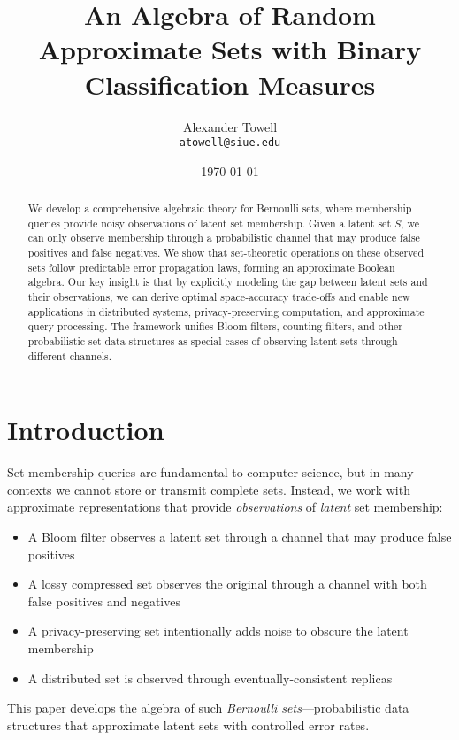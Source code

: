 \documentclass[11pt,final,hidelinks]{article}
\title{An Algebra of Random Approximate Sets with Binary Classification Measures}
\author{
    Alexander Towell\\
    \texttt{atowell@siue.edu}
}
\date{\today}
\begin{document}
\maketitle
\NotationSection

\begin{abstract}
We develop a comprehensive algebraic theory for Bernoulli sets, where membership queries provide noisy observations of latent set membership. Given a latent set $S$, we can only observe membership through a probabilistic channel that may produce false positives and false negatives. We show that set-theoretic operations on these observed sets follow predictable error propagation laws, forming an approximate Boolean algebra. Our key insight is that by explicitly modeling the gap between latent sets and their observations, we can derive optimal space-accuracy trade-offs and enable new applications in distributed systems, privacy-preserving computation, and approximate query processing. The framework unifies Bloom filters, counting filters, and other probabilistic set data structures as special cases of observing latent sets through different channels.
\end{abstract}

\section{Introduction}

Set membership queries are fundamental to computer science, but in many contexts we cannot store or transmit complete sets. Instead, we work with approximate representations that provide \emph{observations} of \emph{latent} set membership:

\begin{itemize}
    \item A Bloom filter observes a latent set through a channel that may produce false positives
    \item A lossy compressed set observes the original through a channel with both false positives and negatives  
    \item A privacy-preserving set intentionally adds noise to obscure the latent membership
    \item A distributed set is observed through eventually-consistent replicas
\end{itemize}

This paper develops the algebra of such \emph{Bernoulli sets}—probabilistic data structures that approximate latent sets with controlled error rates.
\end{document}
